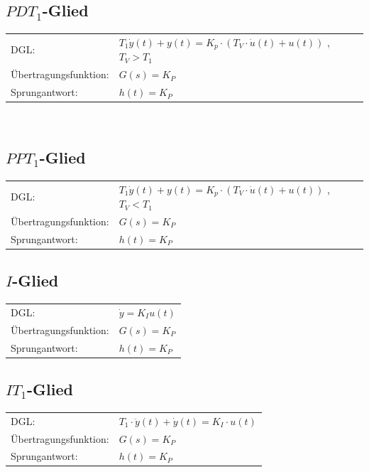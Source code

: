 \subsection{$PDT_1$-Glied}
\begin{tabular}{ll}
\rule[-2ex]{0pt}{5.5ex} DGL: & $T_1 \dot{y}(t) + y(t) = K_p \cdot \left( T_V \cdot \dot{u}(t) + u(t)\right)$ , $T_V > T_1$ \\ 
\rule[-2ex]{0pt}{5.5ex} Übertragungsfunktion: & $G(s) = K_P$ \\ 
\rule[-2ex]{0pt}{5.5ex} Sprungantwort: & $h(t) = K_P$ \\ 
\end{tabular} \\
\subsection{$PPT_1$-Glied}
\begin{tabular}{ll}
\rule[-2ex]{0pt}{5.5ex} DGL: & $T_1 \dot{y}(t) + y(t) = K_p \cdot \left( T_V \cdot \dot{u}(t) + u(t)\right)$ , $T_V < T_1$ \\ 
\rule[-2ex]{0pt}{5.5ex} Übertragungsfunktion: & $G(s) = K_P$ \\ 
\rule[-2ex]{0pt}{5.5ex} Sprungantwort: & $h(t) = K_P$ \\ 
\end{tabular} 
\subsection{$I$-Glied}
\begin{tabular}{ll}
\rule[-2ex]{0pt}{5.5ex} DGL: & $\dot{y} = K_I u(t)$ \\ 
\rule[-2ex]{0pt}{5.5ex} Übertragungsfunktion: & $G(s) = K_P$ \\ 
\rule[-2ex]{0pt}{5.5ex} Sprungantwort: & $h(t) = K_P$ \\ 
\end{tabular} 
\subsection{$IT_1$-Glied}
\begin{tabular}{ll}
\rule[-2ex]{0pt}{5.5ex} DGL: & $T_1 \cdot \ddot{y}(t) + \dot{y}(t) = K_I \cdot u(t)$ \\ 
\rule[-2ex]{0pt}{5.5ex} Übertragungsfunktion: & $G(s) = K_P$ \\ 
\rule[-2ex]{0pt}{5.5ex} Sprungantwort: & $h(t) = K_P$ \\ 
\end{tabular} 

